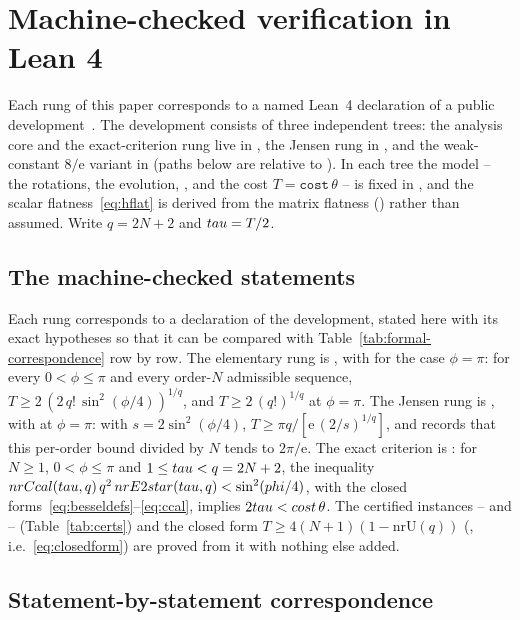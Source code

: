 \section{Machine-checked verification in Lean 4}
\label{sec:formal}

Each rung of this paper corresponds to a named Lean~4 declaration of a public
development~\cite{LeanRepo}. The development consists of three independent trees: the analysis core and the
exact-criterion rung live in , the Jensen rung in , and the weak-constant
$8/\mathrm{e}$ variant in  (paths below are relative to ). In each tree the model
-- the rotations, the evolution, , and the cost $T=\texttt{cost}\,\theta$ --
is fixed in , and the scalar flatness~\eqref{eq:hflat} is derived
from the matrix flatness () rather than assumed. Write $q=2N+2$ and
$tau=T/2$.

\subsection{The machine-checked statements}

Each rung corresponds to a declaration of the development, stated here with its exact
hypotheses so that it can be compared with Table~\ref{tab:formal-correspondence} row by row.
The elementary rung is , with  for the case
$\phi=\pi$: for every $0<\phi\le\pi$ and every order-$N$ admissible sequence,
$T\ge2\,(2\,q!\,\sin^{2}(\phi/4))^{1/q}$, and $T\ge2\,(q!)^{1/q}$ at $\phi=\pi$. The Jensen
rung is , with  at $\phi=\pi$: with
$s=2\sin^2(\phi/4)$, $T\ge\pi q/[\mathrm{e}\,(2/s)^{1/q}]$, and 
records that this per-order bound divided by $N$ tends to $2\pi/\mathrm{e}$. The exact
criterion is : for $N\ge1$, $0<\phi\le\pi$ and $1\le tau<q=2N+2$, the
inequality $nrCcal(tau,q)\,q^2\,nrE2star(tau,q)<\sin^2(phi/4)$,
with the closed forms~\eqref{eq:besseldefs}--\eqref{eq:ccal}, implies
$2tau<cost\,\theta$. The certified instances -- and
-- (Table~\ref{tab:certs}) and the closed form
$T\ge4(N+1)(1-\mathrm{nrU}(q))$ (, i.e.~\eqref{eq:closedform}) are proved
from it with nothing else added.

\subsection{Statement-by-statement correspondence}

